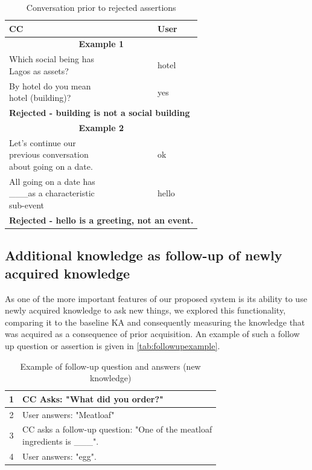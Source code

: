 {%
\begin{table}[h]
\centering
\caption{Conversation prior to rejected assertions}
\label{tab:rejectedconversation}
\begin{tabular}{|l|l|}
	\hline
	\textbf{CC}  & \textbf{User} \\
    \hline
    \multicolumn{2}{|c|}{\textbf{Example 1}} \\
    \hline
    \makecell[l]{Which social being has \\ Lagos as assets?} & hotel \\
    \hline
    \makecell[l]{By hotel do you mean\\ hotel (building)?} & yes\\
    \hline
    \multicolumn{2}{|l|}{\textbf{Rejected - building is not a social building}}\\
    \hline
    \multicolumn{2}{|c|}{\textbf{Example 2}} \\
    \hline
    \makecell[l]{Let's continue our\\ previous conversation \\ about going on a date.} & ok \\
    \hline
    \makecell[l]{All going on a date has\\ \_\_\_as a characteristic\\sub-event} & hello\\
    \hline
    \multicolumn{2}{|l|}{\textbf{Rejected - hello is a greeting, not an event.}}\\
    \hline
\end{tabular}
\end{table}

\subsection{Additional knowledge as follow-up of newly acquired knowledge}
\label{section:followups}
As one of the more important features of our proposed system is its ability to 
use newly acquired knowledge to ask new things, we explored this functionality, 
comparing it to the baseline KA and consequently measuring the knowledge that 
was acquired as a consequence of prior acquisition. An example of such a 
follow up question or assertion is given in \autoref{tab:followupexample}.

\begin{table}[h]
\centering
\caption{Example of follow-up question and answers (new knowledge)}
\label{tab:followupexample}
\begin{tabular}{|c|l|}
	\hline
	1  & CC Asks: "What did you order?" \\
    \hline
    2 & User answers: "Meatloaf" \\
    \hline
    3 & \makecell[l]{CC asks a follow-up question: "One of the meatloaf\\ ingredients is \_\_\_". }\\
    \hline
    4 & User answers: "egg". \\
    \hline
\end{tabular}
\end{table}

}
